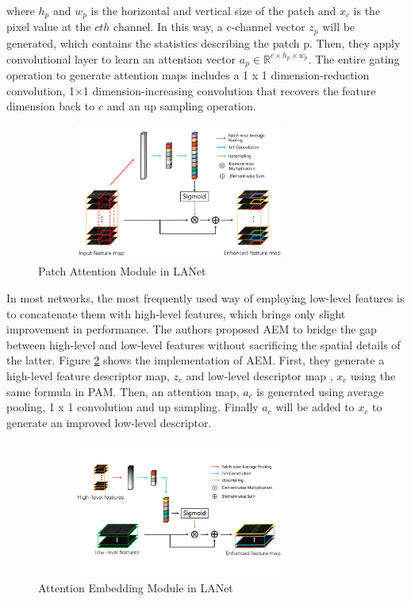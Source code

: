 where $h_p$ and $w_p$ is the horizontal and vertical size of the patch and $x_c$ is the pixel value at the $cth$ channel. In this way, a c-channel vector $z_p$ will be generated, which contains the statistics describing the patch p. Then, they apply convolutional layer to learn an attention vector $a_p \in \mathbb{R}^{c \times h_p \times w_p}$. The entire gating operation to generate attention maps includes a 1 x 1 dimension-reduction convolution, 1×1 dimension-increasing convolution that recovers the feature dimension back to $c$ and an up sampling operation.
\begin{figure}[ht]
\includegraphics[width=9.5cm, height=4.5cm]{images/pam.png}
\centering
\caption{Patch Attention Module in LANet \protect\cite{lanet}}
\label{fig:pam}
\end{figure}
\FloatBarrier

In most networks, the most frequently used way of employing low-level features is to concatenate them with high-level features, which brings only slight improvement in performance. The authors proposed AEM to bridge the gap between high-level and low-level features without sacrificing the spatial details of the latter. Figure \ref{fig:aem} shows the implementation of AEM. First, they generate a high-level feature descriptor map, $z_c$ and low-level descriptor map , $x_c$ using the same formula in PAM. Then, an attention map, $a_c$ is generated using average pooling, 1 x 1 convolution and up sampling. Finally $a_c$ will be added to $x_c$ to generate an improved low-level descriptor.  
\begin{figure}[ht]
\includegraphics[width=9.5cm, height=4.5cm]{images/aem.png}
\centering
\caption{Attention Embedding Module in LANet \protect\cite{lanet}}
\label{fig:aem}
\end{figure}
\FloatBarrier


